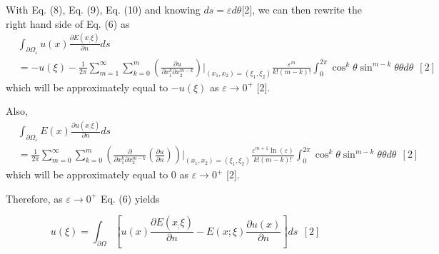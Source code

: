 \documentclass[a4paper,12pt]{article}
\begin{document}
With Eq. (8), Eq. (9), Eq. (10) and knowing $d s = \varepsilon d \theta $[2], we can then rewrite the right hand side of Eq. (6) as
\begin{equation}
\begin{aligned}
&\int_{\partial \Omega_{\varepsilon} } u(x)\frac{\partial E(x_;\xi)}{\partial n} d s \\
&= - u(\xi) - \frac{1}{2\pi} \sum_{m = 1}^{\infty}\sum_{k = 0}^{m } (\frac{\partial u}{\partial x_1^{k} \partial x_2^{m - k}})|_{(x_1,x_2) = (\xi_1,\xi_2)} \frac{\varepsilon^m }{k!( m - k)!}\int_{0}^{2\pi} \cos^k \theta \sin^{m - k}\theta \theta d\theta \ \ [2]
\end{aligned}
\end{equation}
which will be approximately equal to $ - u(\xi)$ as $\varepsilon \to 0^+$ [2]. 
\par Also, 
\begin{equation}
\begin{aligned}
&\int_{\partial \Omega_{\varepsilon} } E(x)\frac{\partial u(x_;\xi)}{\partial n} d s \\
&= \frac{1}{2\pi} \sum_{m = 0}^{\infty}\sum_{k = 0}^{m } (\frac{\partial }{\partial x_1^{k} \partial x_2^{m - k}}(\frac{\partial u}{\partial n}))|_{(x_1,x_2) = (\xi_1,\xi_2)} \frac{\varepsilon^{m+1} \ln(\varepsilon) }{k!( m - k)!}\int_{0}^{2\pi} \cos^k \theta \sin^{m - k}\theta \theta d\theta \ \ [2]
\end{aligned}
\end{equation}
which will be approximately equal to $0$ as $\varepsilon \to 0^{+}$ [2]. 

\par Therefore, as $\varepsilon \to 0^{+}$ Eq. (6) yields

\begin{equation}
u(\xi) = \int_{\partial \Omega } [u(x)\frac{\partial E(x_;\xi)}{\partial n} - E(x;\xi) \frac{\partial u(x)}{\partial n}] ds \ \ [2]
\end{equation}
\end{document}
